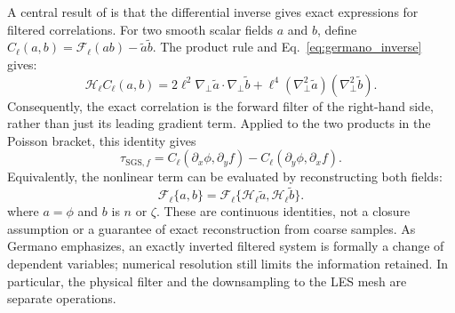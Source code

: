 \documentclass[authoryear,preprint,review,12pt]{elsarticle}
\begin{document}
A central result of \citet{germano_differential_1986} is that the differential inverse gives exact expressions for filtered correlations. For two smooth scalar fields $a$ and $b$, define $C_\ell(a,b)=\mathcal{F}_\ell(ab)-\widetilde a\widetilde b$. The product rule and Eq.~\eqref{eq:germano_inverse} gives:
\begin{equation}
    \mathcal{H}_\ell C_\ell(a,b)
    =2\ell^2\nabla_\perp\widetilde a\cdot\nabla_\perp\widetilde b
     +\ell^4(\nabla_\perp^2\widetilde a)(\nabla_\perp^2\widetilde b).
    \label{eq:germano_correlation}
\end{equation}
Consequently, the exact correlation is the forward filter of the right-hand side, rather than just its leading gradient term. Applied to the two products in the Poisson bracket, this identity gives
\begin{equation}
    \tau_{\mathrm{SGS},f}
    =C_\ell(\partial_x\phi,\partial_y f)
     -C_\ell(\partial_y\phi,\partial_x f).
\end{equation}
Equivalently, the nonlinear term can be evaluated by reconstructing both fields:
\begin{equation}
    \mathcal{F}_\ell\{a,b\}
    =\mathcal{F}_\ell\{
       \mathcal{H}_\ell\widetilde a,
       \mathcal{H}_\ell\widetilde b\}.
    \label{eq:germano_bracket_inverse}
\end{equation}
where $a=\phi$ and $b$ is $n$ or $\zeta$.
These are continuous identities, not a closure assumption or a guarantee of exact reconstruction from coarse samples. As Germano emphasizes, an exactly inverted filtered system is formally a change of dependent variables; numerical resolution still limits the information retained. 
In particular, the physical filter and the downsampling to the LES mesh are separate operations. 
\end{document}
